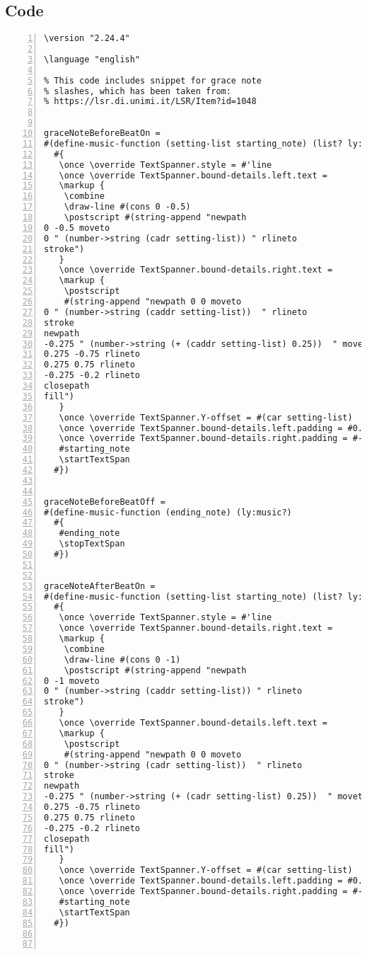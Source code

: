 \subsection{Code}
\begin{Verbatim}[numbers=left,xleftmargin=5mm]
\version "2.24.4"

\language "english"

% This code includes snippet for grace note
% slashes, which has been taken from:
% https://lsr.di.unimi.it/LSR/Item?id=1048


graceNoteBeforeBeatOn =
#(define-music-function (setting-list starting_note) (list? ly:music? )
  #{
   \once \override TextSpanner.style = #'line
   \once \override TextSpanner.bound-details.left.text =
   \markup {
    \combine
    \draw-line #(cons 0 -0.5)
    \postscript #(string-append "newpath 
0 -0.5 moveto 
0 " (number->string (cadr setting-list)) " rlineto 
stroke")
   }
   \once \override TextSpanner.bound-details.right.text =
   \markup {
    \postscript
    #(string-append "newpath 0 0 moveto 
0 " (number->string (caddr setting-list))  " rlineto 
stroke 
newpath 
-0.275 " (number->string (+ (caddr setting-list) 0.25))  " moveto 
0.275 -0.75 rlineto 
0.275 0.75 rlineto 
-0.275 -0.2 rlineto 
closepath 
fill")
   }
   \once \override TextSpanner.Y-offset = #(car setting-list)
   \once \override TextSpanner.bound-details.left.padding = #0.5
   \once \override TextSpanner.bound-details.right.padding = #-0.25
   #starting_note
   \startTextSpan
  #})


graceNoteBeforeBeatOff =
#(define-music-function (ending_note) (ly:music?)
  #{
   #ending_note
   \stopTextSpan
  #})


graceNoteAfterBeatOn =
#(define-music-function (setting-list starting_note) (list? ly:music?)
  #{
   \once \override TextSpanner.style = #'line
   \once \override TextSpanner.bound-details.right.text =
   \markup {
    \combine
    \draw-line #(cons 0 -1)
    \postscript #(string-append "newpath 
0 -1 moveto 
0 " (number->string (caddr setting-list)) " rlineto 
stroke")
   }
   \once \override TextSpanner.bound-details.left.text =
   \markup {
    \postscript
    #(string-append "newpath 0 0 moveto 
0 " (number->string (cadr setting-list))  " rlineto 
stroke 
newpath 
-0.275 " (number->string (+ (cadr setting-list) 0.25))  " moveto 
0.275 -0.75 rlineto 
0.275 0.75 rlineto 
-0.275 -0.2 rlineto 
closepath 
fill")
   }
   \once \override TextSpanner.Y-offset = #(car setting-list)
   \once \override TextSpanner.bound-details.left.padding = #0.5
   \once \override TextSpanner.bound-details.right.padding = #-0.25
   #starting_note
   \startTextSpan
  #})



\end{Verbatim}
